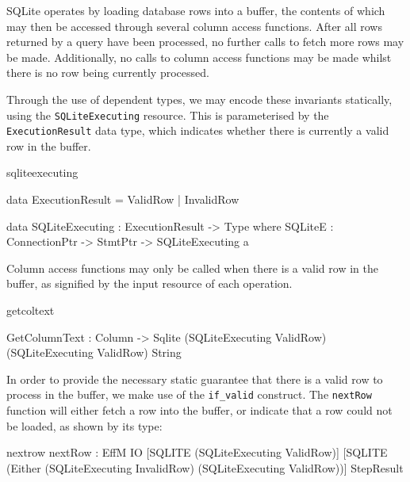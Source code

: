 SQLite operates by loading database rows into a buffer, the contents of which may then be accessed through several column access functions. After all rows returned by a query have been processed, no further calls to fetch more rows may be made. Additionally, no calls to column access functions may be made whilst there is no row being currently processed. 

Through the use of dependent types, we may encode these invariants statically, using the \texttt{SQLiteExecuting} resource. This is parameterised by the \texttt{ExecutionResult} data type, which indicates whether there is currently a valid row in the buffer.

\begin{SaveVerbatim}{sqliteexecuting}

data ExecutionResult = ValidRow
                     | InvalidRow

data SQLiteExecuting : ExecutionResult -> Type where
  SQLiteE : ConnectionPtr -> 
            StmtPtr -> SQLiteExecuting a
  
\end{SaveVerbatim}
\noindent
Column access functions may only be called when there is a valid row in the buffer, as signified by the input resource of each operation.

\begin{SaveVerbatim}{getcoltext}

GetColumnText : Column -> 
                Sqlite (SQLiteExecuting ValidRow) 
                       (SQLiteExecuting ValidRow)
                       String
                         
\end{SaveVerbatim}

\noindent
In order to provide the necessary static guarantee that there is a valid row to process in the buffer, we make use of the \texttt{if\_valid} construct. The \texttt{nextRow} function will either fetch a row into the buffer, or indicate that a row could not be loaded, as shown by its type:

\begin{SaveVerbatim}{nextrow}
nextRow : EffM IO [SQLITE (SQLiteExecuting ValidRow)] 
                  [SQLITE (Either (SQLiteExecuting InvalidRow)
                                  (SQLiteExecuting ValidRow))] 
                  StepResult
\end{SaveVerbatim}

